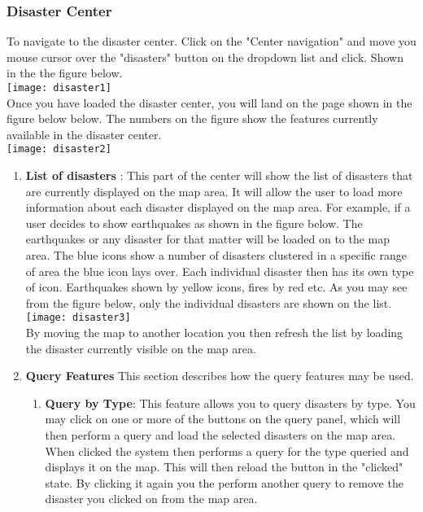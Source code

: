 \subsubsection{Disaster Center}
To navigate to the disaster center. Click on the "Center navigation" and move you mouse cursor over the "disasters" button on the dropdown list and click. Shown in the the figure below. \\[0.5cm]
\texttt{[image: disaster1]} \\[0.5cm]
Once you have loaded the disaster center, you will land on the page shown in the figure below below. The numbers on the figure show the features currently available in the disaster center. \\[0.5cm]
\texttt{[image: disaster2]} \\[0.5cm]
	\begin{enumerate}
		\item \textbf{List of disasters} : This part of the center will show the list of disasters that are currently displayed on the map area. It will allow the user to load more information about each disaster displayed on the map area. For example, if a user decides to show earthquakes as shown in the figure below. The earthquakes or any disaster for that matter will be loaded on to the map area. The blue icons show a number of disasters clustered in a specific range of area the blue icon lays over. Each individual disaster then has its own type of icon. Earthquakes shown by yellow icons, fires by red etc. As you may see from the figure below, only the individual disasters are shown on the list. \\[0.5cm]
		\texttt{[image: disaster3]} \\[0.5cm]
		By moving the map to another location you then refresh the list by loading the disaster currently visible on the map area.
		\item \textbf{Query Features}
		This section describes how the query features may be used.
		\begin{enumerate}
		\item \textbf{Query by Type}: This feature allows you to query disasters by type. You may click on one or more of the buttons on the query panel, which will then perform a query and load the selected disasters on the map area. When clicked the system then performs a query for the type queried and displays it on the map. This will then reload the button in the "clicked" state. By clicking it again you the perform another query to remove the disaster you clicked on from the map area.

\end{enumerate}
\end{enumerate}
